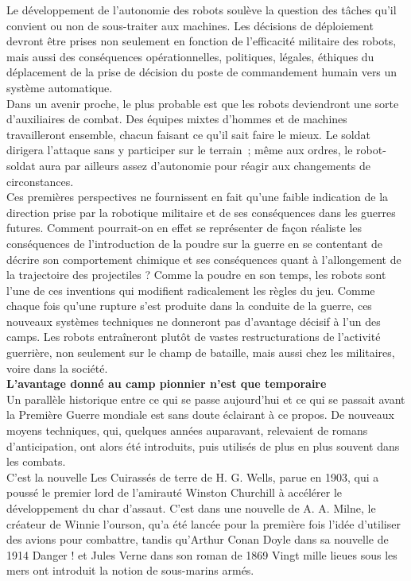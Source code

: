 \documentclass[8pt]{article}
\begin{document}
Le développement de l’autonomie des robots soulève la question des tâches qu’il convient ou non de sous-traiter aux machines. Les décisions de déploiement devront être prises non seulement en fonction de l’efficacité militaire des robots, mais aussi des conséquences opérationnelles, politiques, légales, éthiques du déplacement de la prise de décision du poste de commandement humain vers un système automatique.\\

Dans un avenir proche, le plus probable est que les robots deviendront une sorte d’auxiliaires de combat. Des équipes mixtes d’hommes et de machines travailleront ensemble, chacun faisant ce qu’il sait faire le mieux. Le soldat dirigera l’attaque sans y participer sur le terrain~; même aux ordres, le robot-soldat aura par ailleurs assez d’autonomie pour réagir aux changements de circonstances.\\

Ces premières perspectives ne fournissent en fait qu’une faible indication de la direction prise par la robotique militaire et de ses conséquences dans les guerres futures. Comment pourrait-on en effet se représenter de façon réaliste les conséquences de l’introduction de la poudre sur la guerre en se contentant de décrire son comportement chimique et ses conséquences quant à l’allongement de la trajectoire des projectiles ? Comme la poudre en son temps, les robots sont l’une de ces inventions qui modifient radicalement les règles du jeu. Comme chaque fois qu’une rupture s’est produite dans la conduite de la guerre, ces nouveaux systèmes techniques ne donneront pas d’avantage décisif à l’un des camps. Les robots entraîneront plutôt de vastes restructurations de l’activité guerrière, non seulement sur le champ de bataille, mais aussi chez les militaires, voire dans la société.\\

\textbf{L’avantage donné au camp pionnier n’est que temporaire}\\

Un parallèle historique entre ce qui se passe aujourd’hui et ce qui se passait avant la Première Guerre mondiale est sans doute éclairant à ce propos. De nouveaux moyens techniques, qui, quelques années auparavant, relevaient de romans d’anticipation, ont alors été introduits, puis utilisés de plus en plus souvent dans les combats.\\

C’est la nouvelle Les Cuirassés de terre de H. G. Wells, parue en 1903, qui a poussé le premier lord de l’amirauté Winston Churchill à accélérer le développement du char d’assaut. C’est dans une nouvelle de A. A. Milne, le créateur de Winnie l’ourson, qu’a été lancée pour la première fois l’idée d’utiliser des avions pour combattre, tandis qu’Arthur Conan Doyle dans sa nouvelle de 1914 Danger ! et Jules Verne dans son roman de 1869 Vingt mille lieues sous les mers ont introduit la notion de sous-marins armés.\\
\end{document}
